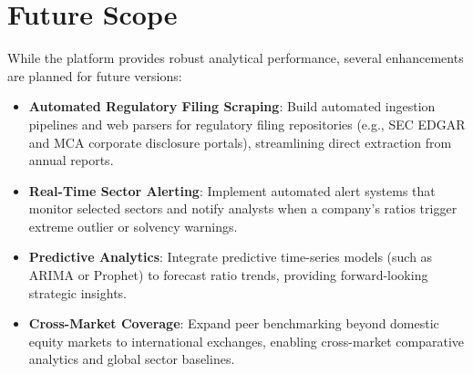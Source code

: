 \section{Future Scope}
While the platform provides robust analytical performance, several enhancements are planned for future versions:
\begin{itemize}
    \item \textbf{Automated Regulatory Filing Scraping}: Build automated ingestion pipelines and web parsers for regulatory filing repositories (e.g., SEC EDGAR and MCA corporate disclosure portals), streamlining direct extraction from annual reports.
    \item \textbf{Real-Time Sector Alerting}: Implement automated alert systems that monitor selected sectors and notify analysts when a company's ratios trigger extreme outlier or solvency warnings.
    \item \textbf{Predictive Analytics}: Integrate predictive time-series models (such as ARIMA or Prophet) to forecast ratio trends, providing forward-looking strategic insights.
    \item \textbf{Cross-Market Coverage}: Expand peer benchmarking beyond domestic equity markets to international exchanges, enabling cross-market comparative analytics and global sector baselines.
\end{itemize}
